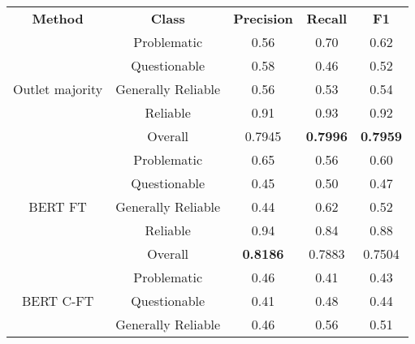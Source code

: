 \begin{table}[htbp]
    \centering
    \scriptsize
    \begin{tabular}{| c | c | c | c | c |}
        \hline                            \textbf{Method} & \textbf{Class}     & \textbf{Precision} & \textbf{Recall} & \textbf{F1}     \\\cline{1-5}
        \multirow{5}{*}{Outlet majority}                  & Problematic        & 0.56               & 0.70            & 0.62            \\
                                                          & Questionable       & 0.58               & 0.46            & 0.52            \\
                                                          & Generally Reliable & 0.56               & 0.53            & 0.54            \\
                                                          & Reliable           & 0.91               & 0.93            & 0.92            \\\cline{2-5}
                                                          & Overall            & 0.7945             & \textbf{0.7996} & \textbf{0.7959} \\
        \hline
        \multirow{5}{*}{BERT FT}                          & Problematic        & 0.65               & 0.56            & 0.60            \\
                                                          & Questionable       & 0.45               & 0.50            & 0.47            \\
                                                          & Generally Reliable & 0.44               & 0.62            & 0.52            \\
                                                          & Reliable           & 0.94               & 0.84            & 0.88            \\\cline{2-5}
                                                          & Overall            & \textbf{0.8186}    & 0.7883          & 0.7504          \\
        \hline
        \multirow{5}{*}{BERT C-FT}                        & Problematic        & 0.46               & 0.41            & 0.43            \\
                                                          & Questionable       & 0.41               & 0.48            & 0.44            \\
                                                          & Generally Reliable & 0.46               & 0.56            & 0.51            \\

\end{tabular}
\end{table}

